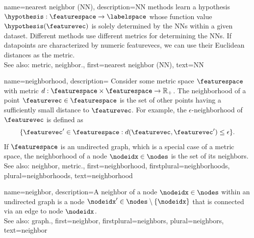 {name={nearest neighbor (NN)},
	description={NN methods learn a \gls{hypothesis} 
		$\hypothesis: \featurespace \rightarrow \labelspace$ whose \gls{function} value $\hypothesis(\featurevec)$ 
		is solely determined by the NNs within a given \gls{dataset}. Different 
		methods use different \glspl{metric} for determining the NNs. If \glspl{datapoint} 
		are characterized by numeric \glspl{featurevec}, we can use their Euclidean distances as 
		the \gls{metric}.
					\\ 
		See also: \gls{metric}, \gls{neighbor}.},
	first={nearest neighbor (NN)},
	text={NN} 
}

 {name={neighborhood},
 	description={
 	Consider some \gls{metric} space $\featurespace$ with \gls{metric} 
	$d: \featurespace \times \featurespace \rightarrow \mathbb{R}_{+}$.	
 	The neighborhood of a point $\featurevec \in \featurespace$ 
 	is the set of other points having a sufficiently small distance to $\featurevec$. 
 	For example, the $\epsilon$-neighborhood of $\featurevec$ is defined as
 	$$ \{ \featurevec' \in \featurespace : d(\featurevec, \featurevec') \leq \epsilon \}.$$
	If $\featurespace$ is an undirected \gls{graph}, which is a special case of 
 	a \gls{metric} space, the neighborhood of a node $\nodeidx \in \nodes$ 
 	is the set of its \glspl{neighbor}.
 				\\ 
 	See also: \gls{neighbor}, \gls{metric}.},
 	first={neighborhood},
	firstplural={neighborhoods},
 	plural={neighborhoods},
 	text={neighborhood} 
 }


{name={neighbor},
	description={A neighbor of a node $\nodeidx \in \nodes$ 
		within an undirected \gls{graph} is a node $\nodeidx' \in \nodes \setminus \{ \nodeidx\}$ 
		that is connected via an edge to node $\nodeidx$.
				\\ 
		See also: \gls{graph}.},
	first={neighbor},
	firstplural={neighbors}, 
	plural={neighbors}, 
	text={neighbor} 
}

